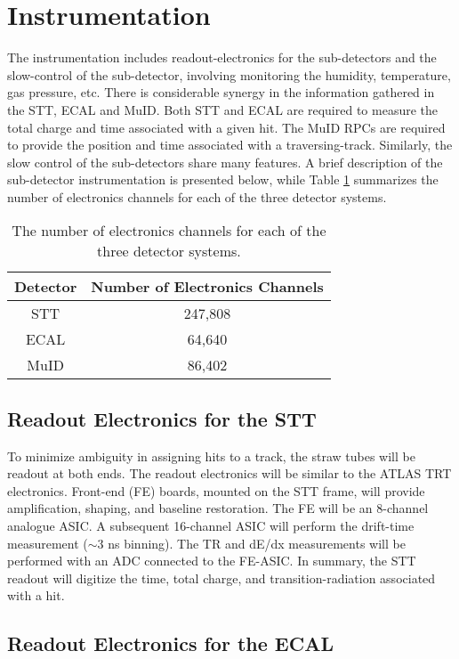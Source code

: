 \section{Instrumentation}

The instrumentation includes readout-electronics for the sub-detectors
and the slow-control of the sub-detector, involving monitoring the humidity, 
temperature, gas pressure, etc.
There is considerable synergy in the information gathered in the STT, ECAL and MuID.
Both STT and ECAL are required to measure the total charge and time associated with a 
given hit. The MuID RPCs are required to provide the position and time associated with 
a traversing-track. Similarly, the slow control of the sub-detectors
share many features. 
A brief description of the sub-detector instrumentation is presented below, while
Table \ref{elect_ch} summarizes the number of electronics channels for each of the
three detector systems. 

\begin{table}
\centering
  \caption{\label{elect_ch} The number of electronics channels for each of the
three detector systems.}
  \begin{tabular}{| c | c |}
    \hline
Detector&Number of Electronics Channels \\
    \hline
STT & 247,808 \\
ECAL & 64,640 \\
MuID & 86,402 \\
     \hline
  \end{tabular}
\end{table}

\subsection{Readout Electronics for the STT}

To minimize ambiguity in assigning hits to a track, the straw tubes will be readout 
at both ends. The readout electronics will be similar to the ATLAS TRT electronics. 
Front-end (FE) boards, mounted on the STT frame, will provide amplification, shaping, 
and baseline restoration. The FE will be an 8-channel analogue ASIC. A 
subsequent 16-channel ASIC will perform the drift-time measurement ($\sim 3$ ns binning). 
The TR and dE/dx measurements will be performed with an ADC connected to the FE-ASIC.
In summary, the STT readout will digitize the time, total charge, and 
transition-radiation associated with a hit.

\subsection{Readout Electronics for the ECAL}


